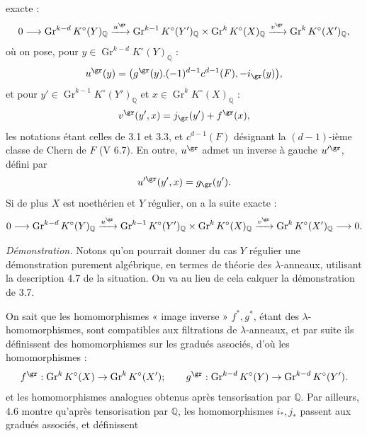 exacte :
\[
0\longrightarrow
\operatorname{Gr}^{k-d}K^\circ(Y)_{\mathbb Q}
\xrightarrow{u^{\gr}}
\operatorname{Gr}^{k-1}K^\circ(Y')_{\mathbb Q}
\times
\operatorname{Gr}^{k}K^\circ(X)_{\mathbb Q}
\xrightarrow{v^{\gr}}
\operatorname{Gr}^{k}K^\circ(X')_{\mathbb Q},
\]
où on pose, pour \(y\in \operatorname{Gr}^{k-d}K^\circ(Y)_{\mathbb Q}\) :
\[
  u^{\gr}(y)=
  \bigl(g^{\gr}(y).(-1)^{d-1}c^{d-1}(F),-i_{\gr}(y)\bigr),
\]
et pour \(y'\in \operatorname{Gr}^{k-1}K^\circ(Y')_{\mathbb Q}\) et \(x\in \operatorname{Gr}^{k}K^\circ(X)_{\mathbb Q}\) :
\[
  v^{\gr}(y',x)=j_{\gr}(y')+f^{\gr}(x),
\]
les notations étant celles de 3.1 et 3.3, et \(c^{d-1}(F)\) désignant la \((d-1)\)-ième classe de Chern de \(F\) (V 6.7). En outre, \(u^{\gr}\) admet un inverse à gauche \(u'^{\gr}\), défini par
\[
  u'^{\gr}(y',x)=g_{\gr}(y').
\]
Si de plus \(X\) est noethérien et \(Y\) régulier, on a la suite exacte :
\[
0\longrightarrow
\operatorname{Gr}^{k-d}K^\circ(Y)_{\mathbb Q}
\xrightarrow{u^{\gr}}
\operatorname{Gr}^{k-1}K^\circ(Y')_{\mathbb Q}
\times
\operatorname{Gr}^{k}K^\circ(X)_{\mathbb Q}
\xrightarrow{v^{\gr}}
\operatorname{Gr}^{k}K^\circ(X')_{\mathbb Q}
\longrightarrow0.
\]

\emph{Démonstration.} Notons qu'on pourrait donner du cas \(Y\) régulier une démonstration purement algébrique, en termes de théorie des \(\lambda\)-anneaux, utilisant la description 4.7 de la situation. On va au lieu de cela calquer la démonstration de 3.7.

On sait que les homomorphismes « image inverse » \(f^*,g^*\), étant des \(\lambda\)-homomorphismes, sont compatibles aux filtrations de \(\lambda\)-anneaux, et par suite ils définissent des homomorphismes sur les gradués associés, d'où les homomorphismes :
\[
  f^{\gr}:\operatorname{Gr}^kK^\circ(X)\to\operatorname{Gr}^kK^\circ(X');
  \qquad
  g^{\gr}:\operatorname{Gr}^{k-d}K^\circ(Y)\to\operatorname{Gr}^{k-d}K^\circ(Y').
\]
et les homomorphismes analogues obtenus après tensorisation par \(\mathbb Q\). Par ailleurs, 4.6 montre qu'après tensorisation par \(\mathbb Q\), les homomorphismes \(i_*,j_*\) passent aux gradués associés, et définissent

